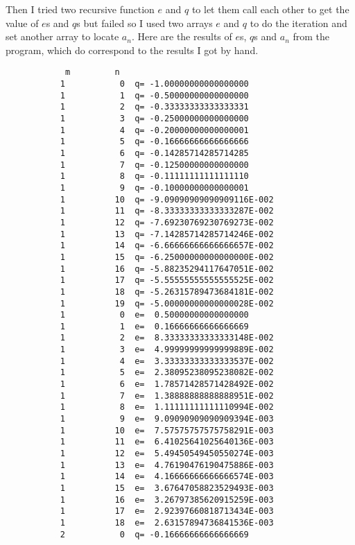 \documentclass{article}
\begin{document}
Then I tried two recursive function $e$ and $q$ to let them call each other to get the value of $e$s and $q$s but failed so I used two arrays $e$ and $q$ to do the iteration and set another array to locate $a_n$.  Here are the results of  $e$s, $q$s and $a_n$ from the program, which do correspond to the results I got by hand.
\begin{verbatim}
            m         n
           1           0  q= -1.00000000000000000     
           1           1  q= -0.50000000000000000     
           1           2  q= -0.33333333333333331     
           1           3  q= -0.25000000000000000     
           1           4  q= -0.20000000000000001     
           1           5  q= -0.16666666666666666     
           1           6  q= -0.14285714285714285     
           1           7  q= -0.12500000000000000     
           1           8  q= -0.11111111111111110     
           1           9  q= -0.10000000000000001     
           1          10  q= -9.09090909090909116E-002
           1          11  q= -8.33333333333333287E-002
           1          12  q= -7.69230769230769273E-002
           1          13  q= -7.14285714285714246E-002
           1          14  q= -6.66666666666666657E-002
           1          15  q= -6.25000000000000000E-002
           1          16  q= -5.88235294117647051E-002
           1          17  q= -5.55555555555555525E-002
           1          18  q= -5.26315789473684181E-002
           1          19  q= -5.00000000000000028E-002
           1           0  e=  0.50000000000000000     
           1           1  e=  0.16666666666666669     
           1           2  e=  8.33333333333333148E-002
           1           3  e=  4.99999999999999889E-002
           1           4  e=  3.33333333333333537E-002
           1           5  e=  2.38095238095238082E-002
           1           6  e=  1.78571428571428492E-002
           1           7  e=  1.38888888888888951E-002
           1           8  e=  1.11111111111110994E-002
           1           9  e=  9.09090909090909394E-003
           1          10  e=  7.57575757575758291E-003
           1          11  e=  6.41025641025640136E-003
           1          12  e=  5.49450549450550274E-003
           1          13  e=  4.76190476190475886E-003
           1          14  e=  4.16666666666666574E-003
           1          15  e=  3.67647058823529493E-003
           1          16  e=  3.26797385620915259E-003
           1          17  e=  2.92397660818713434E-003
           1          18  e=  2.63157894736841536E-003
           2           0  q= -0.16666666666666669     

\end{verbatim}
\end{document}
